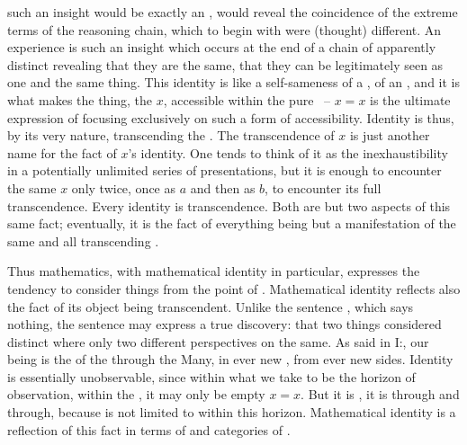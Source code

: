 {  such an insight would be exactly an , would reveal the
   coincidence of the extreme terms of the reasoning chain, which to
  begin with were (thought) different.  An   experience is such an
  insight which occurs at the end of a chain of apparently distinct
   revealing that they are  the same, that they can
  be legitimately seen as one and the same thing. This identity is like a
  self-sameness of a , of an , and it is what makes
  the thing, the $x$, accessible within the pure \hoa\ -- $x=x$ is the ultimate
  expression of focusing exclusively on such a form of accessibility.  Identity
  is thus, by its very nature, transcending the \hoa. The transcendence of $x$
  is just another name for the fact of $x$'s identity. One tends to think of it
  as the inexhaustibility in a potentially unlimited series of 
  presentations, but it is enough to encounter the same $x$ only twice, once as
  $a$ and then as $b$, to encounter its full transcendence.  Every identity is
  transcendence. Both are but two aspects of this same fact; eventually, it is
  the fact of everything being but a manifestation of the same and all
  transcending .
  
  \pa Thus mathematics, with mathematical identity in particular, expresses the
  tendency to consider things from the point of .  Mathematical
  identity reflects also the fact of its object being transcendent. Unlike the
  sentence , which says nothing, the
  sentence  may express a true
  discovery: that two things considered distinct where only two different
  perspectives on the same.  As said in I:, our
  being is the  of the  through the Many, in ever new
  , from ever new sides.  Identity is essentially unobservable,
  since within what we take to be the horizon of observation, within the \hoa,
  it may only be empty $x=x$.  But it is , it is
   through and through, because  is not limited
  to  within this horizon.  Mathematical identity is a
  reflection of this fact in terms of  and categories of
  .  }


